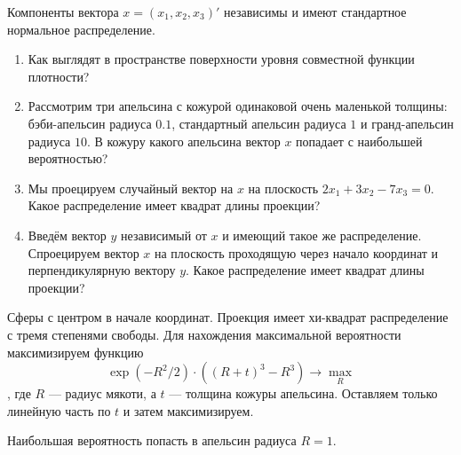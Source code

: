 \begin{problem}
Компоненты вектора $x=(x_1, x_2, x_3)'$ независимы и имеют стандартное нормальное распределение.

\begin{enumerate}
\item Как выглядят в пространстве поверхности уровня совместной функции плотности?
\item Рассмотрим три апельсина с кожурой одинаковой очень маленькой толщины: бэби-апельсин радиуса $0.1$, стандартный апельсин радиуса $1$ и гранд-апельсин радиуса $10$. В кожуру какого апельсина вектор $x$ попадает с наибольшей вероятностью?
\item Мы проецируем случайный вектор на $x$ на плоскость $2x_1 + 3x_2 - 7x_3 = 0$. Какое распределение имеет квадрат длины проекции?
\item Введём вектор $y$ независимый от $x$ и имеющий такое же распределение. Спроецируем вектор $x$ на плоскость проходящую через начало координат и перпендикулярную вектору $y$.  Какое распределение имеет квадрат длины проекции?
\end{enumerate}


\begin{sol}
Сферы с центром в начале координат. Проекция имеет хи-квадрат распределение с тремя степенями свободы.
Для нахождения максимальной вероятности максимизируем функцию
\[
\exp(-R^2/2) \cdot ((R+t)^3 - R^3) \to \max_R
\],
где $R$ — радиус мякоти, а $t$ — толщина кожуры апельсина. Оставляем только линейную часть по $t$ и затем максимизируем.

Наибольшая вероятность попасть в апельсин радиуса $R=1$.
\end{sol}
\end{problem}


\section{ }


